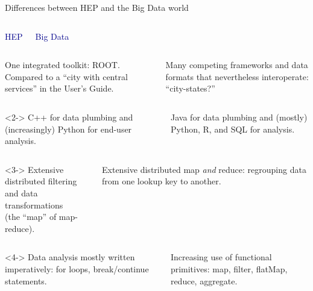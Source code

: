 \documentclass{beamer}
\begin{document}
\begin{frame}{Differences between HEP and the Big Data world}
\begin{columns}
\centering \textcolor{darkblue}{HEP}

\centering \textcolor{darkblue}{Big Data}
\end{columns}

\vfill
\begin{columns}
One integrated toolkit: ROOT. Compared to a ``city with central services'' in the User's Guide.

Many competing frameworks and data formats that nevertheless interoperate: ``city-states?''
\end{columns}

\vfill
{}

\vfill
\begin{columns}<2->
C++ for data plumbing and (increasingly) Python for end-user analysis.

Java for data plumbing and (mostly) Python, R, and SQL for analysis.
\end{columns}

\vfill
{}

\vfill
\begin{columns}<3->
Extensive distributed filtering \\ and data transformations \\ (the ``map'' of map-reduce).

Extensive distributed map {\it and} reduce: regrouping data from one lookup key to another.
\end{columns}

\vfill
{}

\vfill
\begin{columns}<4->
Data analysis mostly written imperatively: for loops, break/continue statements.

Increasing use of functional primitives: map, filter, flatMap, reduce, aggregate.
\end{columns}
\end{frame}
\end{document}
